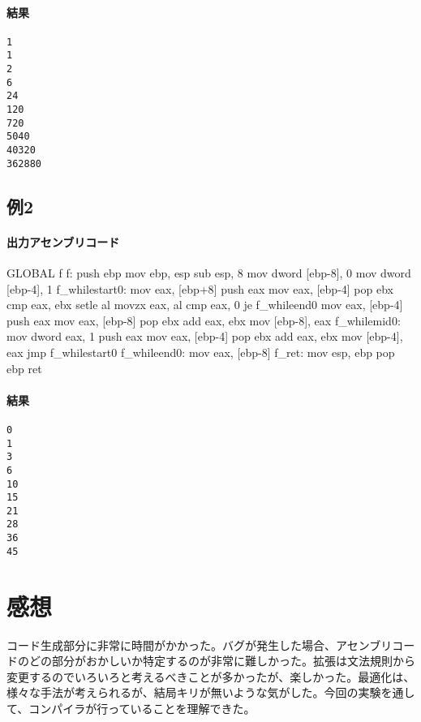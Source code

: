 \documentclass[titlepage, a4paper,12pt]{jarticle}
\begin{document}
\paragraph{結果}
\begin{verbatim}
1
1
2
6
24
120
720
5040
40320
362880
\end{verbatim}
\subsection{例2}

\paragraph{出力アセンブリコード}
\begin{verbatimtab}[4]
	GLOBAL	f
f:
	push	ebp
	mov	ebp, esp
	sub	esp, 8
	mov	dword [ebp-8], 0
	mov	dword [ebp-4], 1
f_whilestart0:
	mov	eax, [ebp+8]
	push	eax
	mov	eax, [ebp-4]
	pop	ebx
	cmp	eax, ebx
	setle	al
	movzx	eax, al
	cmp	eax, 0
	je	f_whileend0
	mov	eax, [ebp-4]
	push	eax
	mov	eax, [ebp-8]
	pop	ebx
	add	eax, ebx
	mov	[ebp-8], eax
f_whilemid0:
	mov	dword eax, 1
	push	eax
	mov	eax, [ebp-4]
	pop	ebx
	add	eax, ebx
	mov	[ebp-4], eax
	jmp	f_whilestart0
f_whileend0:
	mov	eax, [ebp-8]
f_ret:
	mov	esp, ebp
	pop	ebp
	ret
\end{verbatimtab}
\paragraph{結果}
\begin{verbatim}
0
1
3
6
10
15
21
28
36
45
\end{verbatim}

\section{感想}
コード生成部分に非常に時間がかかった。バグが発生した場合、アセンブリコードのどの部分がおかしいか特定するのが非常に難しかった。拡張は文法規則から変更するのでいろいろと考えるべきことが多かったが、楽しかった。最適化は、様々な手法が考えられるが、結局キリが無いような気がした。今回の実験を通して、コンパイラが行っていることを理解できた。
\end{document}
